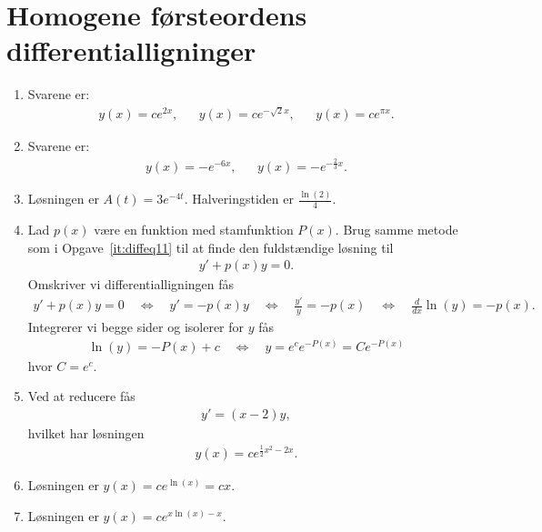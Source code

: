 \section{Homogene førsteordens differentialligninger}
\begin{enumerate}
	
	\item Svarene er:
	\begin{align*}
	y(x)=ce^{2x},&& y(x)=ce^{-\sqrt{2}x} ,&& y(x)=ce^{\pi x}.
	\end{align*}
	
	
	\item Svarene er:
	\begin{align*}
	y(x)=-e^{-6x},&& y(x)=-e^{-\frac{2}{3}x}.
	\end{align*}

	

	
	
	
	\item \label{it:diffeq31ans} Løsningen er $A(t)=3e^{-4t}$. Halveringstiden er $\frac{\ln(2)}{4}$.

	
	\item \label{it:diffeq12ans} Lad $p(x)$ være en funktion med stamfunktion $P(x)$. Brug samme metode som i Opgave~\ref{it:diffeq11} til at finde den fuldstændige løsning til
	\begin{align*}
	y'+p(x)y=0.
	\end{align*}
	Omskriver vi differentialligningen fås
	\begin{align*}
	y'+p(x)y=0\quad \Leftrightarrow\quad y'=-p(x)y\quad\Leftrightarrow\quad \frac{y'}{y}=-p(x)\quad\Leftrightarrow\quad \frac{d}{dx}\ln(y) =-p(x).
	\end{align*}
	Integrerer vi begge sider og isolerer for $y$ fås
	\begin{align*}
	\ln(y)=-P(x)+c\quad \Leftrightarrow\quad y=e^c e^{-P(x)}=Ce^{-P(x)}
	\end{align*}
	hvor $C=e^c$.
	
	\item Ved at reducere fås
	\begin{align*}
	y'=(x-2)y,
	\end{align*}
	hvilket har løsningen
	\begin{align*}
	y(x)=ce^{\frac{1}{2}x^2-2x}.
	\end{align*}


	\item Løsningen er $y(x)=ce^{\ln(x)}=cx$.

	\item Løsningen er $y(x)=ce^{x\ln(x)-x}$.


\end{enumerate}
